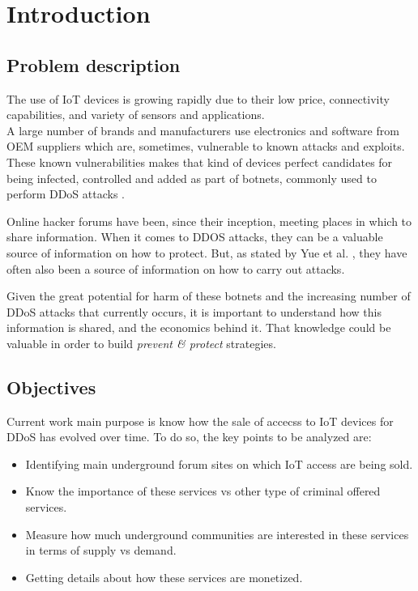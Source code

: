 \chapter{Introduction}
\label{chapter:introduction}

\section{Problem description}

The use of IoT devices is growing rapidly due to their low price, connectivity capabilities, and variety of sensors and applications. \\
A large number of brands and manufacturers use electronics and software from OEM suppliers  which are, sometimes, vulnerable to known attacks and exploits. These known vulnerabilities makes that kind of devices perfect candidates for being infected, controlled and added as part of botnets, commonly used to perform DDoS attacks \cite{perakovic2015analysis}.

Online hacker forums have been, since their inception, meeting places in which to share information. When it comes to DDOS attacks, they can be a valuable source of information on how to protect. But, as stated by Yue et al. \cite{yue2019see}, they have often also been a source of information on how to carry out attacks.

Given the great potential for harm of these botnets and the increasing number of DDoS attacks that currently occurs, it is important to understand how this information is shared, and the economics behind it. That knowledge could be valuable in order to build \textit{prevent \& protect} strategies.

\section{Objectives}

Current work main purpose is know how the sale of accecss to IoT devices for DDoS has evolved over time.
To do so, the key points to be analyzed are:

\begin{itemize}
\item Identifying main underground forum sites on which IoT access are being sold.
\item Know the importance of these services vs other type of criminal offered services.
\item Measure how much underground communities are interested in these services in terms of supply vs demand.
\item Getting details about how these services are monetized.
\end{itemize}

